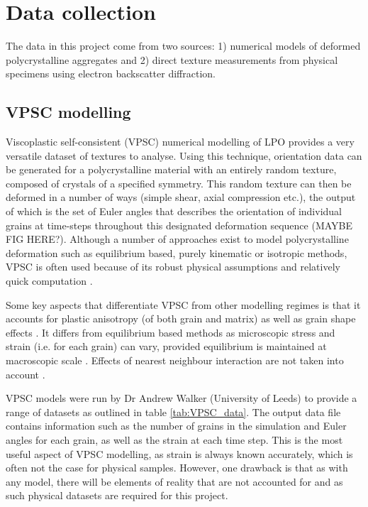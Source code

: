 \documentclass[a4paper,12pt,twoside]{report}
\numberwithin{equation}{chapter}
\begin{document}
\section{Data collection} \label{sec:data}
The data in this project come from two sources: 1) numerical models of deformed polycrystalline aggregates and 2) direct texture measurements from physical specimens using electron backscatter diffraction. 

\subsection{VPSC modelling}
Viscoplastic self-consistent (VPSC) numerical modelling of LPO \citep{Molinari1987,Lebensohn1993} provides a very versatile dataset of textures to analyse. Using this technique, orientation data can be generated for a polycrystalline material with an entirely random texture, composed of crystals of a specified symmetry. This random texture can then be deformed in a number of ways (simple shear, axial compression etc.), the output of which is the set of Euler angles that describes the orientation of individual grains at time-steps throughout this designated deformation sequence (MAYBE FIG HERE?). Although a number of approaches exist to model polycrystalline deformation such as equilibrium based, purely kinematic or isotropic methods, VPSC is often used because of its robust physical assumptions and relatively quick computation \citep[][and references therein]{Tommasi2000}. 

Some key aspects that differentiate VPSC from other modelling regimes is that it accounts for plastic anisotropy (of both grain and matrix) as well as grain shape effects \citep[as introduced by][]{Lebensohn1993}. It differs from equilibrium based methods as microscopic stress and strain (i.e. for each grain) can vary, provided equilibrium is maintained at macroscopic scale \citep{Tommasi2000}. Effects of nearest neighbour interaction are not taken into account \citep[see][for details]{Castelnau1996}.

VPSC models were run by Dr Andrew Walker (University of Leeds) to provide a range of datasets as outlined in table \ref{tab:VPSC_data}. The output data file contains information such as the number of grains in the simulation and Euler angles for each grain, as well as the strain at each time step. This is the most useful aspect of VPSC modelling, as strain is always known accurately, which is often not the case for physical samples. However, one drawback is that as with any model, there will be elements of reality that are not accounted for and as such physical datasets are required for this project.
\end{document}
